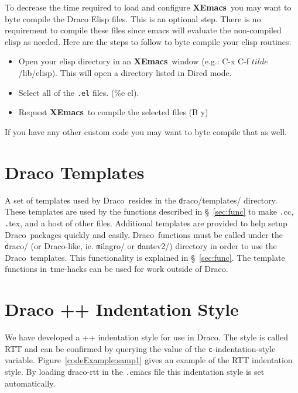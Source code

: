 \documentclass[11pt]{nmemo}
\newcommand{\comp}[1]{{\normalfont\texttt#1}}
\newcommand{\draco}{{\normalfont\sffamily Draco}}
\newcommand{\xemacs}{{\normalfont\bfseries XEmacs}}
\begin{document}
To decrease the time required to load and configure \xemacs\ you may
want to byte compile the Draco Elisp files.  This is an optional
step.  There is no requirement to compile these files since emacs will
evaluate the non-compiled elisp as needed.  Here are the steps to
follow to byte compile your elisp routines:

\begin{itemize}
\item Open your elisp directory in an \xemacs\ window (e.g.: C-x C-f 
$tilde$/lib/elisp).  This will open a directory listed in Dired mode.
\item Select all of the \texttt{.el} files. (\%e el).
\item Request \xemacs\ to compile the selected files (B y)
\end{itemize}

If you have any other custom code you may want to byte compile that
as well.


\section{Draco Templates}

A set of templates used by \draco\ resides in the
\comp{draco/templates/} directory.  These templates are used by the
functions described in \S~\ref{sec:func} to make \comp{.cc},
\comp{.tex}, and a host of other files.  Additional templates are
provided to help setup \draco\ packages quickly and easily.  \draco\ 
functions must be called under the \comp{draco/} (or \draco-like, ie.
\comp{milagro/} or \comp{dantev2/}) directory in order to use the
\draco\ templates.  This functionality is explained in
\S~\ref{sec:func}.  The template functions in \comp{tme-hacks} can be
used for work outside of \draco.


\section{Draco \C++ Indentation Style}

We have developed a \C++ indentation style for use in \draco.  The
style is called RTT and can be confirmed by querying the value of the
\comp{c-indentation-style} variable.  Figure~\ref{codeExample:samp1} gives an
example of the RTT indentation style.  
By loading \comp{draco-rtt} in
the \comp{.emacs} file this indentation style is set automatically.
\end{document}
